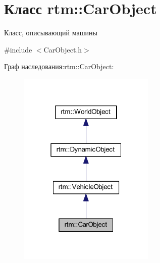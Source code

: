 \hypertarget{classrtm_1_1_car_object}{}\section{Класс rtm\+:\+:Car\+Object}
\label{classrtm_1_1_car_object}


Класс, описывающий машины  




{\ttfamily \#include $<$Car\+Object.\+h$>$}



Граф наследования\+:rtm\+:\+:Car\+Object\+:
\nopagebreak
\begin{figure}[H]
\begin{center}
\leavevmode
\includegraphics[width=184pt]{classrtm_1_1_car_object__inherit__graph}
\end{center}
\end{figure}

